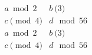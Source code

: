 \documentclass[preview,border=6pt]{standalone}
\begin{document}
\fontsize{30.000000}{36.000000}\selectfont
$\displaystyle \begin{array}{cc} a \bmod 2 & b \pod 3 \\ c \pmod{4} & d \mod{56} \\ \displaystyle a\bmod 2 & \displaystyle b \pod 3 \\ \displaystyle c\pmod{4} & \displaystyle d \mod{56} \end{array}$
\end{document}
